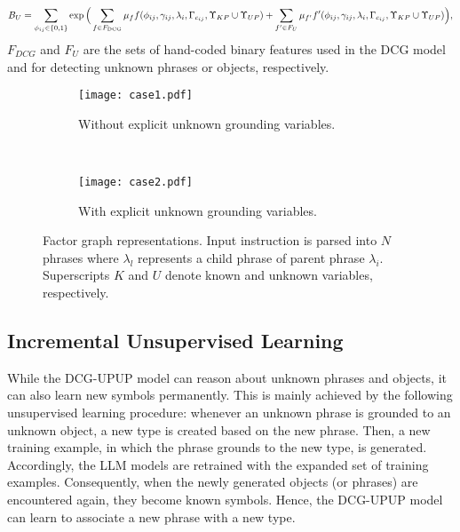 \begin{equation}
B_U= \sum_{\phi_{ij} \in \{0,1\}}\exp \Big( \sum_{f \in F_{\text{DCG}}} \mu_f f(\phi_{ij},\gamma_{ij},\lambda_i,\Gamma_{c_{ij}},\Upsilon_{KP} \cup \Upsilon_{UP}) \nonumber \\
+ \sum_{f^\prime \in F_{U}} \mu_{f^\prime} f^\prime(\phi_{ij},\gamma_{ij},\lambda_i,\Gamma_{c_{ij}},\Upsilon_{KP} \cup \Upsilon_{UP}) \Big), \nonumber
\end{equation}
$F_{DCG}$ and $F_{U}$ are the sets of hand-coded binary features used in the DCG model and for detecting unknown phrases or objects, respectively.
\begin{figure}
\centering
\begin{subfigure}[t]{0.45\columnwidth}
\centering
\texttt{[image: case1.pdf]}
\caption{Without explicit unknown grounding variables.}
\label{fig:wo_unknown}
\end{subfigure}
~
\begin{subfigure}[t]{0.51\columnwidth}
\centering
\texttt{[image: case2.pdf]}
\caption{With explicit unknown grounding variables.}
\label{fig:w_unknown}
\end{subfigure}

\caption{Factor graph representations. Input instruction is parsed into $N$ phrases where $\lambda_l$ represents a child phrase of parent phrase $\lambda_i$. Superscripts $K$ and $U$ denote known and unknown variables, respectively.}
\end{figure}

\subsection{Incremental Unsupervised Learning}
While the DCG-UPUP model can reason about unknown phrases and objects, it can also learn new symbols permanently. This is mainly achieved by the following unsupervised learning procedure: whenever an unknown phrase is grounded to an unknown object, a new type is created based on the new phrase. Then, a new training example, in which the phrase grounds to the new
type, is generated. Accordingly, the LLM models are retrained with the expanded set of training examples. Consequently, when the newly generated objects (or phrases) are encountered again, they become known symbols. Hence, the DCG-UPUP model can learn to associate a new phrase with a new type.

